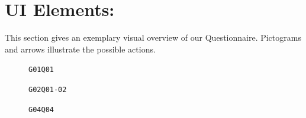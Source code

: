\pagebreak

\section{UI Elements:}
This section gives an exemplary visual overview of our Questionnaire. Pictograms and arrows illustrate the possible actions.\\
\vspace{20pt}

\begin{multicols}{2}
    {
        \begin{figure}[H]
            \centering
            \caption{\texttt{G01Q01}}
            \label{fig:sureyouhaveachoice}
        \end{figure}
        \begin{figure}[H]
            \centering
            \caption{\texttt{G02Q01-02}}
            \label{fig:range}
        \end{figure}
        \begin{figure}[H]
            \centering
            \caption{\texttt{G04Q04}}
            \label{fig:slider}
        \end{figure}
        
}
\end{multicols}
